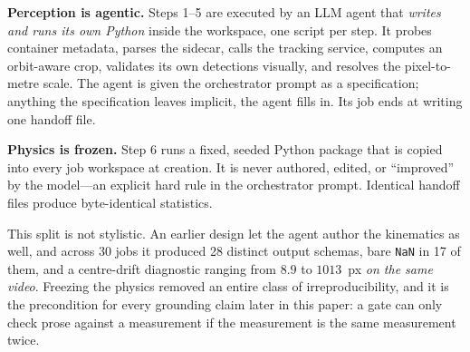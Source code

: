 \documentclass[conference]{IEEEtran}
\begin{document}
\textbf{Perception is agentic.} Steps 1--5 are executed by an LLM agent that
\emph{writes and runs its own Python} inside the workspace, one script per step.
It probes container metadata, parses the sidecar, calls the tracking service,
computes an orbit-aware crop, validates its own detections visually, and
resolves the pixel-to-metre scale. The agent is given the orchestrator prompt
as a specification; anything the specification leaves implicit, the agent fills
in. Its job ends at writing one handoff file.

\textbf{Physics is frozen.} Step 6 runs a fixed, seeded Python package that is
copied into every job workspace at creation. It is never authored, edited, or
``improved'' by the model---an explicit hard rule in the orchestrator prompt.
Identical handoff files produce byte-identical statistics.

This split is not stylistic. An earlier design let the agent author the
kinematics as well, and across 30 jobs it produced 28 distinct output schemas,
bare \texttt{NaN} in 17 of them, and a centre-drift diagnostic ranging from
$8.9$ to $1013$~px \emph{on the same video}. Freezing the physics removed an
entire class of irreproducibility, and it is the precondition for every
grounding claim later in this paper: a gate can only check prose against a
measurement if the measurement is the same measurement twice.
\end{document}
